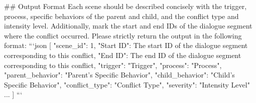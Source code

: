\begin{spverbatim}
## Output Format
Each scene should be described concisely with the trigger, process, specific behaviors of the parent and child, and the conflict type and intensity level. Additionally, mark the start and end IDs of the dialogue segment where the conflict occurred. Please strictly return the output in the following format:
```json
[
    {
        "scene_id": 1,
        "Start ID": The start ID of the dialogue segment corresponding to this conflict,
        "End ID": The end ID of the dialogue segment corresponding to this conflict,
        "trigger": "Trigger",
        "process": "Process",
        "parent_behavior": "Parent's Specific Behavior",
        "child_behavior": "Child's Specific Behavior",
        "conflict_type": "Conflict Type",
        "severity": "Intensity Level"
    }
    ...
]
```
\end{spverbatim}
\endgroup

